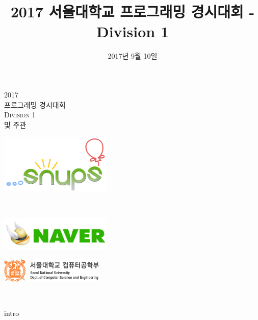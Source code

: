 \documentclass[11pt,a4paper,oneside,final]{article}
\title{2017 서울대학교 프로그래밍 경시대회 - Division 1}
\date{2017년 9월 10일}
\begin{document}
\begin{titlepage}
\begin{center}

\vspace*{3cm}

\textsc{\Huge2017}\\[0.5cm]
\textsc{ 프로그래밍 경시대회}\\[1cm]
\textsc{\Huge Division 1}\\[1cm]

\vspace{1.6cm}
\textsc{ 및 주관}\\[0.0cm]

\begin{center}
\includegraphics[width=0.4\textwidth]{snups.png}
\end{center}

\vspace{1cm}
\textsc{}\\[0.0cm]

\begin{center}
\includegraphics[width=0.4\textwidth]{naver.jpg}
\end{center}

\begin{center}
\includegraphics[width=0.37\textwidth]{snucse-logo.png}
\end{center}

\vspace{1cm}
\textsc{\Large \THEDATE}\\[0.5cm]

\vspace*{\fill}

\end{center}
\end{titlepage}

{intro}
\end{document}
